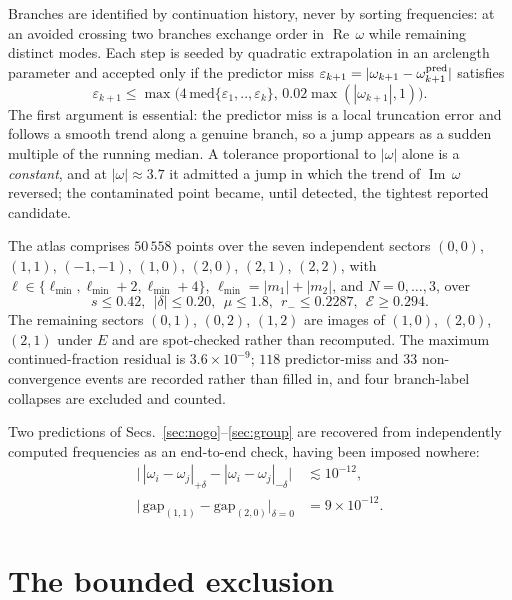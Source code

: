 \documentclass[aps,prd,reprint,superscriptaddress,nofootinbib,longbibliography]{revtex4-2}
\theoremstyle{plain}
\theoremstyle{definition}
\theoremstyle{remark}
\newcommand{\Rem}{\operatorname{Re}}
\newcommand{\Imm}{\operatorname{Im}}
\begin{document}
Branches are identified by continuation history, never by sorting frequencies:
at an avoided crossing two branches exchange order in $\Rem\,\omega$ while
remaining distinct modes. Each step is seeded by quadratic extrapolation in an
arclength parameter and accepted only if the predictor miss
$\varepsilon_{k+1}=|\omega_{k+1}-\omega^{\rm pred}_{k+1}|$ satisfies
\begin{equation}\label{eq:misstest}
  \varepsilon_{k+1}\le\max\!\Big(4\,\mathrm{med}\{\varepsilon_1,..,\varepsilon_k\},\,
  0.02\max(|\omega_{k+1}|,1)\Big).
\end{equation}
The first argument is essential: the predictor miss is a local truncation error
and follows a smooth trend along a genuine branch, so a jump appears as a sudden
multiple of the running median. A tolerance proportional to $|\omega|$ alone is
a \emph{constant}, and at $|\omega|\approx3.7$ it admitted a jump in which the
trend of $\Imm\,\omega$ reversed; the contaminated point became, until detected,
the tightest reported candidate.

The atlas comprises $50\,558$ points over the seven independent sectors
$(0,0)$, $(1,1)$, $(-1,-1)$, $(1,0)$, $(2,0)$, $(2,1)$, $(2,2)$, with
$\ell\in\{\ell_{\min},\ell_{\min}+2,\ell_{\min}+4\}$, $\ell_{\min}=|m_1|+|m_2|$,
and $N=0,\dots,3$, over
\begin{equation}\label{eq:domain}
  s\le0.42,\ \ |\delta|\le0.20,\ \ \mu\le1.8,\ \
  r_-\le0.2287,\ \ \mathcal{E}\ge0.294 .
\end{equation}
The remaining sectors $(0,1)$, $(0,2)$, $(1,2)$ are images of $(1,0)$, $(2,0)$,
$(2,1)$ under $E$ and are spot-checked rather than recomputed. The maximum
continued-fraction residual is $3.6\times10^{-9}$; $118$ predictor-miss and $33$
non-convergence events are recorded rather than filled in, and four
branch-label collapses are excluded and counted.

Two predictions of Secs.~\ref{sec:nogo}--\ref{sec:group} are recovered from
independently computed frequencies as an end-to-end check, having been imposed
nowhere:
\begin{align}
  \big|\,|\omega_i-\omega_j|_{+\delta}-|\omega_i-\omega_j|_{-\delta}\big|
    &\lesssim10^{-12}, \label{eq:check1}\\
  \big|\,\text{gap}_{(1,1)}-\text{gap}_{(2,0)}\big|_{\delta=0}
    &= 9\times10^{-12}. \label{eq:check2}
\end{align}

\section{The bounded exclusion}\label{sec:results}
\end{document}
